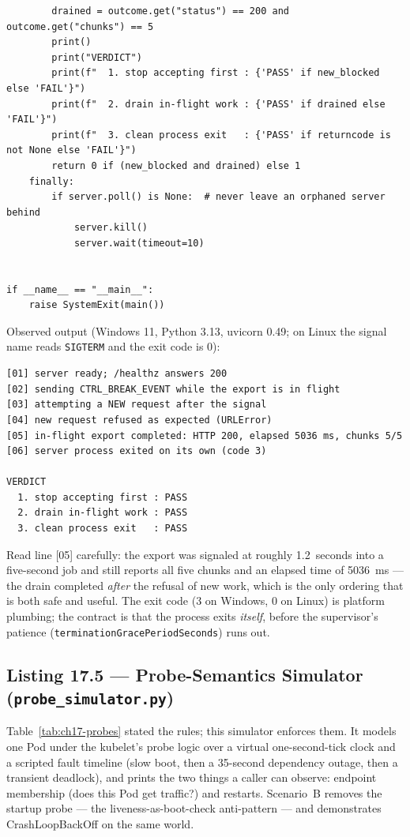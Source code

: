 \begin{verbatim}
        drained = outcome.get("status") == 200 and outcome.get("chunks") == 5
        print()
        print("VERDICT")
        print(f"  1. stop accepting first : {'PASS' if new_blocked else 'FAIL'}")
        print(f"  2. drain in-flight work : {'PASS' if drained else 'FAIL'}")
        print(f"  3. clean process exit   : {'PASS' if returncode is not None else 'FAIL'}")
        return 0 if (new_blocked and drained) else 1
    finally:
        if server.poll() is None:  # never leave an orphaned server behind
            server.kill()
            server.wait(timeout=10)


if __name__ == "__main__":
    raise SystemExit(main())
\end{verbatim}

Observed output (Windows 11, Python 3.13, uvicorn 0.49; on Linux the
signal name reads \texttt{SIGTERM} and the exit code is 0):

\begin{verbatim}
[01] server ready; /healthz answers 200
[02] sending CTRL_BREAK_EVENT while the export is in flight
[03] attempting a NEW request after the signal
[04] new request refused as expected (URLError)
[05] in-flight export completed: HTTP 200, elapsed 5036 ms, chunks 5/5
[06] server process exited on its own (code 3)

VERDICT
  1. stop accepting first : PASS
  2. drain in-flight work : PASS
  3. clean process exit   : PASS
\end{verbatim}

Read line [05] carefully: the export was signaled at roughly 1.2~seconds
into a five-second job and still reports all five chunks and an elapsed
time of 5036~ms --- the drain completed \emph{after} the refusal of new
work, which is the only ordering that is both safe and useful. The exit
code (3 on Windows, 0 on Linux) is platform plumbing; the contract is
that the process exits \emph{itself}, before the supervisor's patience
(\texttt{terminationGracePeriodSeconds}) runs out.

\subsection{Listing 17.5 --- Probe-Semantics Simulator (\texttt{probe\_simulator.py})}
\label{sec:ch17-probesim}
\label{lst:ch17-probesim}

Table~\ref{tab:ch17-probes} stated the rules; this simulator enforces
them. It models one Pod under the kubelet's probe logic over a virtual
one-second-tick clock and a scripted fault timeline (slow boot, then a
35-second dependency outage, then a transient deadlock), and prints the
two things a caller can observe: endpoint membership (does this Pod get
traffic?) and restarts. Scenario~B removes the startup probe --- the
liveness-as-boot-check anti-pattern --- and demonstrates
CrashLoopBackOff on the same world.

